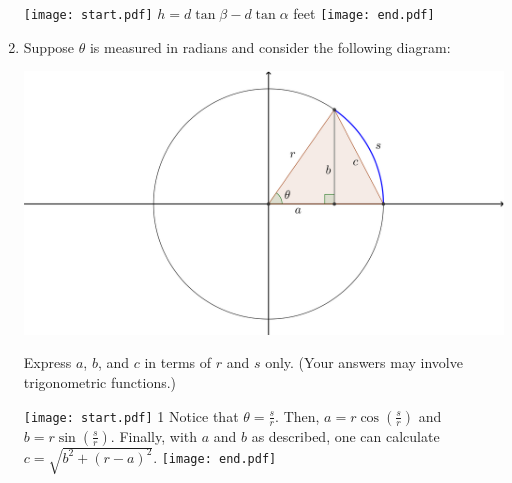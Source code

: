 \documentclass[12pt]{article}
\begin{document}
\begin{enumerate}
\texttt{[image: start.pdf]}
{$h=d\tan\beta-d\tan\alpha$ feet}
\texttt{[image: end.pdf]}


\newpage

\item Suppose $\theta$ is measured in radians and consider the following diagram:
\begin{center}
\includegraphics[scale=0.3]{circle.png}
\end{center}
Express $a$, $b$, and $c$ in terms of $r$ and $s$ only. (Your answers may involve trigonometric functions.)

\texttt{[image: start.pdf]}
{{{1\linewidth}{
Notice that $\theta = \frac{s}{r}$.  Then, $a=r\cos\left(\frac{s}{r}\right)$ and $b=r\sin\left(\frac{s}{r}\right)$.  Finally, with $a$ and $b$ as described, one can calculate $c=\sqrt{b^2+(r-a)^2}$.
}}}
\texttt{[image: end.pdf]}


\end{enumerate}
\end{document}
